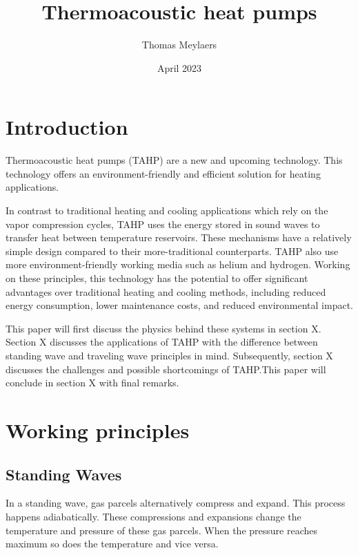 \documentclass{article}
\title{Thermoacoustic heat pumps}
\author{Thomas Meylaers}
\date{April 2023}
\newcommand{\newpara}
    {
      \bigbreak{}
      \noindent
    }
\begin{document}
\maketitle

\newpage

\begin{abstract}

\end{abstract}

\newpage

\tableofcontents

\newpage


\section{Introduction}
Thermoacoustic heat pumps (TAHP) are a new and upcoming technology. This technology offers an environment-friendly and efficient solution for heating applications.
\newpara{}
In contrast to traditional heating and cooling applications which rely on the vapor compression cycles, TAHP uses the energy stored in sound waves to transfer heat between temperature reservoirs. These mechanisms have a relatively simple design compared to their more-traditional counterparts. TAHP also use more environment-friendly working media such as helium and hydrogen.
Working on these principles, this technology has the potential to offer significant advantages over traditional heating and cooling methods, including reduced energy consumption, lower maintenance costs, and reduced environmental impact.\cite{powerofsound}
\newpara{}
This paper will first discuss the physics behind these systems in section X. Section X discusses the applications of TAHP with the difference between standing wave and traveling wave principles in mind. Subsequently, section X discusses the challenges and possible shortcomings of TAHP.\@ This paper will conclude in section X with final remarks.

\section{Working principles}
\subsection{Standing Waves\cite{powerofsound,enginesandrefrigerators,tijaniLoudSpeaker}}
In a standing wave, gas parcels alternatively compress and expand. This process happens adiabatically. These compressions and expansions change the temperature and pressure of these gas parcels. When the pressure reaches maximum so does the temperature and vice versa.
\end{document}
